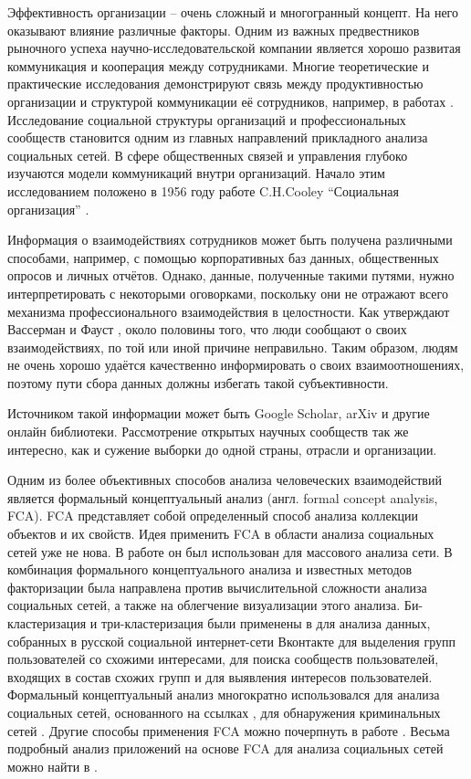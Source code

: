 Эффективность организации – очень сложный и многогранный концепт. 
На него оказывают влияние различные факторы. 
Одним из важных предвестников рыночного успеха научно-исследовательской компании является хорошо развитая коммуникация и кооперация между сотрудниками. 
Многие теоретические и практические исследования демонстрируют связь между продуктивностью организации и структурой коммуникации её сотрудников, например,  в работах  \cite{allen1984managing,noe2006human}.
Исследование социальной структуры организаций и профессиональных сообществ становится одним из главных направлений прикладного анализа социальных сетей. 
В сфере общественных связей и управления глубоко изучаются модели коммуникаций внутри организаций. 
Начало этим исследованием положено в 1956 году работе C.H.Cooley ``Социальная организация'' \cite{cooley1956social}.

Информация о взаимодействиях сотрудников может быть получена различными способами, например, с помощью корпоративных баз данных, общественных опросов и личных отчётов. 
Однако, данные, полученные такими путями, нужно интерпретировать с некоторыми оговорками, поскольку они не отражают всего механизма профессионального взаимодействия в целостности. 
Как утверждают Вассерман и Фауст \cite{wasserman1994social}, около половины того, что люди сообщают о своих взаимодействиях, по той или иной причине неправильно. 
Таким образом, людям не очень хорошо удаётся качественно информировать о своих взаимоотношениях, поэтому пути сбора данных должны избегать такой субъективности.

Источником такой информации может быть Google Scholar, arXiv и другие онлайн библиотеки. 
Рассмотрение открытых научных сообществ так же интересно, как и сужение выборки до одной страны, отрасли и организации. 

Одним из более объективных способов анализа человеческих взаимодействий является формальный концептуальный анализ (англ. formal concept analysis, FCA). 
FCA представляет собой определенный способ анализа коллекции объектов и их свойств. 
Идея применить FCA в области анализа социальных сетей уже не нова. 
В работе \cite{kurtz2009c} он был использован для массового анализа сети. 
В \cite{snasel2009analyzing} комбинация формального концептуального анализа и известных методов факторизации была направлена против вычислительной  сложности анализа социальных сетей, а также на облегчение визуализации этого анализа. 
Би-кластеризация и три-кластеризация были применены в \cite{gnatyshak2012gaining} для анализа данных, собранных в русской социальной интернет-сети Вконтакте для выделения групп пользователей со схожими интересами, для поиска сообществ пользователей, входящих в состав схожих групп и для выявления интересов пользователей. 
Формальный концептуальный анализ многократно использовался для анализа социальных сетей, основанного на ссылках \cite{kuznetsov2007reducing}, 
для обнаружения криминальных сетей \cite{poelmans2012semi}. 
Другие способы применения FCA можно почерпнуть в работе \cite{poelmans2013formal}. 
Весьма подробный анализ приложений на основе FCA для анализа социальных сетей можно найти в \cite{aufaure2013advances, obiedkov2007social, pensa2005towards}.

